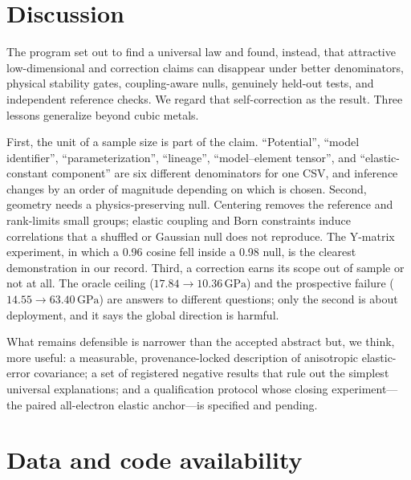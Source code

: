 \documentclass[11pt]{article}
\newcommand{\GPa}{\,\mathrm{GPa}}
\begin{document}
\section{Discussion}

The program set out to find a universal law and found, instead, that attractive low-dimensional and correction claims can disappear under better denominators, physical stability gates, coupling-aware nulls, genuinely held-out tests, and independent reference checks. We regard that self-correction as the result. Three lessons generalize beyond cubic metals.

First, the unit of a sample size is part of the claim. ``Potential'', ``model identifier'', ``parameterization'', ``lineage'', ``model--element tensor'', and ``elastic-constant component'' are six different denominators for one CSV, and inference changes by an order of magnitude depending on which is chosen. Second, geometry needs a physics-preserving null. Centering removes the reference and rank-limits small groups; elastic coupling and Born constraints induce correlations that a shuffled or Gaussian null does not reproduce. The Y-matrix experiment, in which a 0.96 cosine fell inside a 0.98 null, is the clearest demonstration in our record. Third, a correction earns its scope out of sample or not at all. The oracle ceiling ($17.84\to10.36\GPa$) and the prospective failure ($14.55\to63.40\GPa$) are answers to different questions; only the second is about deployment, and it says the global direction is harmful.

What remains defensible is narrower than the accepted abstract but, we think, more useful: a measurable, provenance-locked description of anisotropic elastic-error covariance; a set of registered negative results that rule out the simplest universal explanations; and a qualification protocol whose closing experiment---the paired all-electron elastic anchor---is specified and pending.

\section*{Data and code availability}
\end{document}
